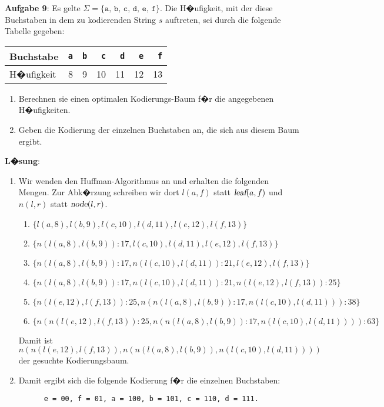\documentclass{article}
\begin{document}
\noindent
\textbf{Aufgabe 9}:
Es gelte $\Sigma = \{ \mathtt{a},\,\mathtt{b},\,\mathtt{c},\,\mathtt{d},\,\mathtt{e},\,\mathtt{f} \}$.
Die H�ufigkeit, mit der diese Buchstaben in dem zu kodierenden String $s$ auftreten, sei durch die
folgende Tabelle gegeben:

\begin{center}
\begin{tabular}[t]{|l|r|r|r|r|r|r|}
\hline
Buchstabe  & \texttt{a} & \texttt{b} & \texttt{c} & \texttt{d} & \texttt{e} & \texttt{f} \\
\hline
H�ufigkeit &          8 &          9 &         10 &         11 &         12 &         13 \\
\hline
\end{tabular}
\end{center}
\begin{enumerate}
\item Berechnen sie einen optimalen Kodierungs-Baum f�r die angegebenen H�ufigkeiten.
\item Geben die Kodierung der einzelnen Buchstaben an, die sich aus diesem Baum ergibt.
\end{enumerate}

\noindent
\textbf{L�sung}:
\begin{enumerate}
\item Wir wenden den Huffman-Algorithmus an und erhalten die folgenden Mengen.  Zur Abk�rzung
      schreiben wir dort $l(a,f)$ statt $\textsl{leaf}(a,f)$ und $n(l,r)$ statt $\textsl{node}(l,r)$.
      \begin{enumerate}
      \item $\{ l(a,8), l(b,9), l(c,10), l(d,11), l(e,12), l(f,13) \}$
      \item $\{ n(l(a,8), l(b,9)):17, l(c,10), l(d,11), l(e,12), l(f,13) \}$
      \item $\{ n(l(a,8), l(b,9)):17, n(l(c,10), l(d,11)):21, l(e,12), l(f,13) \}$
      \item $\{ n(l(a,8), l(b,9)):17, n(l(c,10), l(d,11)):21, n(l(e,12), l(f,13)):25 \}$
      \item $\{ n(l(e,12), l(f,13)):25, n(n(l(a,8), l(b,9)):17, n(l(c,10), l(d,11))):38 \}$
      \item $\{ n(n(l(e,12), l(f,13)):25, n(n(l(a,8), l(b,9)):17, n(l(c,10), l(d,11)))):63 \}$
      \end{enumerate}
      Damit ist 
      \\[0.2cm]
      \hspace*{1.3cm} $n(n(l(e,12), l(f,13)), n(n(l(a,8), l(b,9)), n(l(c,10), l(d,11))))$
      \\[0.2cm]
      der gesuchte Kodierungsbaum.
\item Damit ergibt sich die folgende Kodierung f�r die einzelnen Buchstaben:
      \begin{verbatim}
      e = 00, f = 01, a = 100, b = 101, c = 110, d = 111.
      \end{verbatim}
\end{enumerate}
\end{document}
